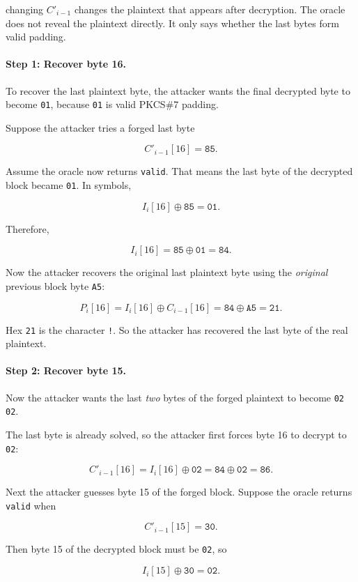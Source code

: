 changing $C'_{i-1}$ changes the plaintext that appears after decryption. The oracle does not reveal the plaintext directly. It only says whether the last bytes form valid padding.

\paragraph{Step 1: Recover byte 16.}
To recover the last plaintext byte, the attacker wants the final decrypted byte to become \texttt{01}, because \texttt{01} is valid PKCS\#7 padding.

Suppose the attacker tries a forged last byte

\[
C'_{i-1}[16] = \texttt{85}.
\]

Assume the oracle now returns \texttt{valid}. That means the last byte of the decrypted block became \texttt{01}. In symbols,

\[
I_i[16] \oplus \texttt{85} = \texttt{01}.
\]

Therefore,

\[
I_i[16] = \texttt{85} \oplus \texttt{01} = \texttt{84}.
\]

Now the attacker recovers the original last plaintext byte using the \emph{original} previous block byte \texttt{A5}:

\[
P_i[16] = I_i[16] \oplus C_{i-1}[16]
        = \texttt{84} \oplus \texttt{A5}
        = \texttt{21}.
\]

Hex \texttt{21} is the character \texttt{!}. So the attacker has recovered the last byte of the real plaintext.

\paragraph{Step 2: Recover byte 15.}
Now the attacker wants the last \emph{two} bytes of the forged plaintext to become \texttt{02 02}.

The last byte is already solved, so the attacker first forces byte 16 to decrypt to \texttt{02}:

\[
C'_{i-1}[16] = I_i[16] \oplus \texttt{02}
             = \texttt{84} \oplus \texttt{02}
             = \texttt{86}.
\]

Next the attacker guesses byte 15 of the forged block. Suppose the oracle returns \texttt{valid} when

\[
C'_{i-1}[15] = \texttt{30}.
\]

Then byte 15 of the decrypted block must be \texttt{02}, so

\[
I_i[15] \oplus \texttt{30} = \texttt{02}.
\]

